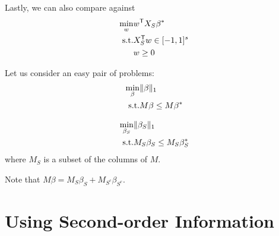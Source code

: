 \documentclass{article}
\begin{document}
Lastly, we can also compare against\\
\begin{align*}
\min_w & w^{\mathsf{T}} X_S \beta^* \\
\textrm{s.t.} & X_S^{\mathsf{T}} w \in [-1,1]^s\\
& w \geq 0
\end{align*}

Let us consider an easy pair of problems:
\begin{align*}
\min_{\beta}  & \|\beta\|_1 \\
\textrm{s.t.} & M \beta \leq M \beta^*
\end{align*}

\begin{align*}
\min_{\beta_S}  & \|\beta_S\|_1 \\
\textrm{s.t.} & M_S \beta_S \leq M_S \beta^*_S
\end{align*}
where $M_S$ is a subset of the columns of $M$.

Note that $M \beta = M_S \beta_S + M_{S^c} \beta_{S^c}$.

\section{Using Second-order Information}
\end{document}
